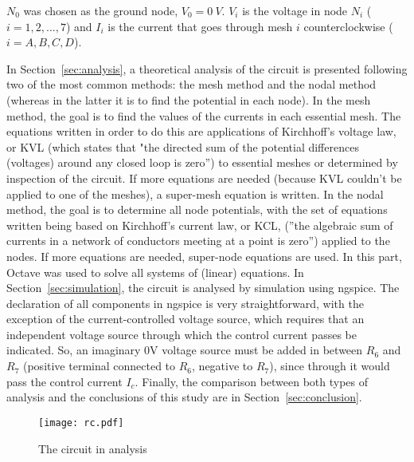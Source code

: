 \par
$N_0$ was chosen as the ground node, $V_0 = 0 \ V$. $V_i$ is the voltage in node $N_i$ ($i=1, 2, ..., 7$) and $I_i$  is the current that goes through mesh $i$ counterclockwise ($i=A, B, C, D$).


\par
In Section~\ref{sec:analysis}, a theoretical analysis of the circuit is presented following two of the most common methods: the mesh method and the nodal method (whereas in the latter it is to find the potential in each node). In the mesh method, the goal is to find the values of the currents in each essential mesh. The equations written in order to do this are applications of Kirchhoff's voltage law, or KVL (which states that "the directed sum of the potential differences (voltages) around any closed loop is zero'') to essential meshes or determined by inspection of the circuit. If more equations are needed (because KVL couldn't be applied to one of the meshes), a super-mesh equation is written. In the nodal method, the goal is to determine all node potentials, with the set of equations written being based on Kirchhoff's current law, or KCL, (''the algebraic sum of currents in a network of conductors meeting at a point is zero'') applied to the nodes. If more equations are needed, super-node equations are used. In this part, Octave was used to solve all systems of (linear) equations. In Section~\ref{sec:simulation}, the circuit is analysed by simulation using ngspice. The declaration of all components in ngspice is very straightforward, with the exception of the current-controlled voltage source, which requires that an independent voltage source through which the control current passes be indicated. So, an imaginary 0V voltage source must be added in between $R_6$ and $R_7$ (positive terminal connected to $R_6$, negative to $R_7$), since through it would pass the control current $I_c$. Finally, the comparison between both types of analysis and the conclusions of this study are in Section~\ref{sec:conclusion}.

\begin{figure}[h] \centering
\texttt{[image: rc.pdf]}
\caption{The circuit in analysis}
\label{fig:rc}
\end{figure}